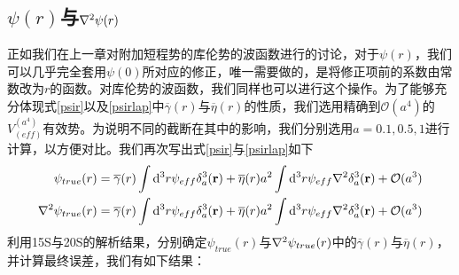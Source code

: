 \documentclass[cs4size,titlepage,twoside]{ctexart}
\begin{document}
\subsection{$\psi(r)$与$\laplacian\psi(r)$}
正如我们在上一章对附加短程势的库伦势的波函数进行的讨论，对于$\psi(r)$，我们可以几乎完全套用$\psi(0)$所对应的修正，唯一需要做的，是将修正项前的系数由常数改为$r$的函数。对库伦势的波函数，我们同样也可以进行这个操作。为了能够充分体现式\eqref{psir}以及\eqref{psirlap}中$\overline{\gamma}(r)$与$\overline{\eta}(r)$的性质，我们选用精确到$\mathcal{O}(a^4)$的$V_(eff)^{(a^4)}$有效势。为说明不同的截断在其中的影响，我们分别选用$a=0.1,0.5,1$进行计算，以方便对比。我们再次写出式\eqref{psir}与\eqref{psirlap}如下
\begin{align*}
	\psi_{true}(r)&=\overline{\gamma}(r)\int\dd^3r\psi_{eff}\delta^3_a(\vb{r})+\overline{\eta}(r)a^2\int\dd^3r\psi_{eff}\laplacian{\delta^3_a(\vb{r})}+\mathcal{O}(a^3)\\
	\laplacian{\psi_{true}(r)}&=\overline{\gamma}(r)\int\dd^3r\psi_{eff}\delta^3_a(\vb{r})+\overline{\eta}(r)a^2\int\dd^3r\psi_{eff}\laplacian{\delta^3_a(\vb{r})}+\mathcal{O}(a^3)
\end{align*}
利用15S与20S的解析结果，分别确定$\psi_{true}(r)$与$\laplacian{\psi_{true}(r)}$中的$\overline{\gamma}(r)$与$\overline{\eta}(r)$，并计算最终误差，我们有如下结果：
\end{document}
